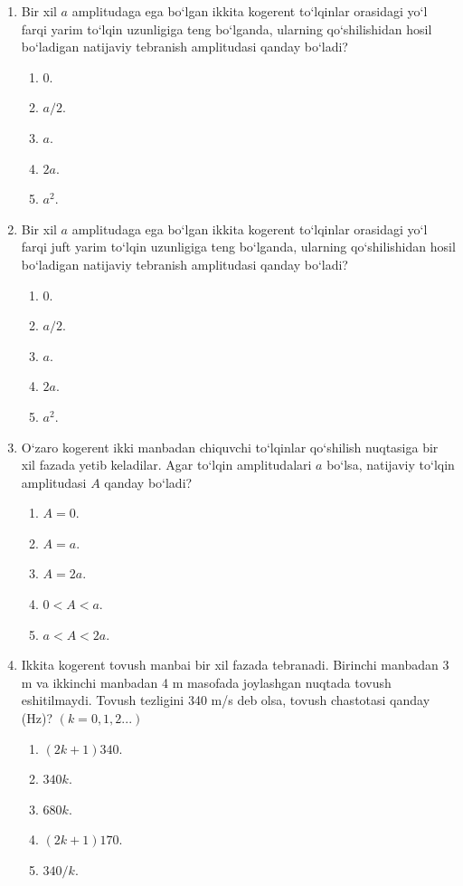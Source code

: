 \begin{enumerate}
\item Bir xil $a$ amplitudaga ega bo‘lgan ikkita kogerent to‘lqinlar orasidagi yo‘l farqi yarim to‘lqin uzunligiga teng bo‘lganda, ularning qo‘shilishidan hosil bo‘ladigan natijaviy tebranish amplitudasi qanday bo‘ladi?
\begin{enumerate}[label=\Alph*)]
\item 0.
\item $a/2$.
\item $a$.
\item $2a$.
\item $a^2$.
\end{enumerate}

\item Bir xil $a$ amplitudaga ega bo‘lgan ikkita kogerent to‘lqinlar orasidagi yo‘l farqi juft yarim to‘lqin uzunligiga teng bo‘lganda, ularning qo‘shilishidan hosil bo‘ladigan natijaviy tebranish amplitudasi qanday bo‘ladi?
\begin{enumerate}[label=\Alph*)]
\item 0.
\item $a/2$.
\item $a$.
\item $2a$.
\item $a^2$.
\end{enumerate}

\item O‘zaro kogerent ikki manbadan chiquvchi to‘lqinlar qo‘shilish nuqtasiga bir xil fazada yetib keladilar. Agar to‘lqin amplitudalari $a$ bo‘lsa, natijaviy to‘lqin amplitudasi $A$ qanday bo‘ladi?
\begin{enumerate}[label=\Alph*)]
\item $A=0$.
\item $A=a$.
\item $A=2a$.
\item $0<A<a$.
\item $a<A<2a$.
\end{enumerate}

\item Ikkita kogerent tovush manbai bir xil fazada tebranadi. Birinchi manbadan 3 m va ikkinchi manbadan 4 m masofada joylashgan nuqtada tovush eshitilmaydi. Tovush tezligini 340 m/s deb olsa, tovush chastotasi qanday (Hz)?
$(k=0,1,2...)$
\begin{enumerate}[label=\Alph*)]
\item $(2k+1)340$.
\item $340k$.
\item $680k$.
\item $(2k+1)170$.
\item $340/k$.
\end{enumerate}


\end{enumerate}
